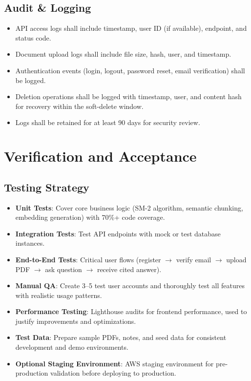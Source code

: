 \documentclass[12pt,a4paper]{article}
\begin{document}
\subsection{Audit \& Logging}

\begin{itemize}
    \item API access logs shall include timestamp, user ID (if available), endpoint, and status code.
    \item Document upload logs shall include file size, hash, user, and timestamp.
    \item Authentication events (login, logout, password reset, email verification) shall be logged.
    \item Deletion operations shall be logged with timestamp, user, and content hash for recovery within the soft-delete window.
    \item Logs shall be retained for at least 90 days for security review.
\end{itemize}

\section{Verification and Acceptance}

\subsection{Testing Strategy}

\begin{itemize}
    \item \textbf{Unit Tests}: Cover core business logic (SM-2 algorithm, semantic chunking, embedding generation) with 70\%+ code coverage.
    \item \textbf{Integration Tests}: Test API endpoints with mock or test database instances.
    \item \textbf{End-to-End Tests}: Critical user flows (register $\to$ verify email $\to$ upload PDF $\to$ ask question $\to$ receive cited answer).
    \item \textbf{Manual QA}: Create 3--5 test user accounts and thoroughly test all features with realistic usage patterns.
    \item \textbf{Performance Testing}: Lighthouse audits for frontend performance, used to justify improvements and optimizations.
    \item \textbf{Test Data}: Prepare sample PDFs, notes, and seed data for consistent development and demo environments.
    \item \textbf{Optional Staging Environment}: AWS staging environment for pre-production validation before deploying to production.
\end{itemize}
\end{document}
